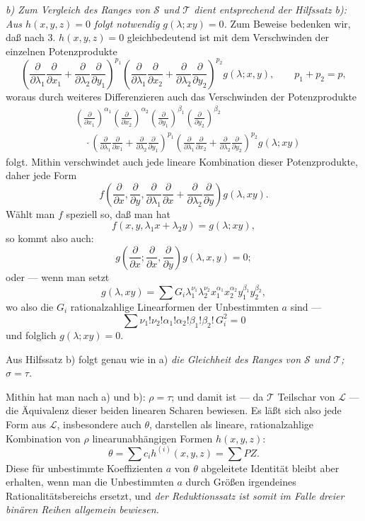 \documentclass[11pt]{article}
\begin{document}
\emph{b) Zum Vergleich des Ranges von $\mathcal S$ und $\mathcal T$ dient entsprechend der Hilfssatz b): Aus $h(x,y,z)=0$ folgt notwendig $g(\lambda;xy)=0$.} Zum Beweise bedenken wir, daß nach 3. $h(x,y,z)=0$ gleichbedeutend ist mit dem Verschwinden der einzelnen Potenzprodukte
\[
 \left(\frac{\partial}{\partial\lambda_1}\frac{\partial}{\partial x_1}
 +\frac{\partial}{\partial\lambda_2}\frac{\partial}{\partial y_1}\right)^{p_1}
 \left(\frac{\partial}{\partial\lambda_1}\frac{\partial}{\partial x_2}
 +\frac{\partial}{\partial\lambda_2}\frac{\partial}{\partial y_2}\right)^{p_2}g(\lambda;x,y),
 \qquad p_1+p_2=p,
\]
woraus durch weiteres Differenzieren auch das Verschwinden der Potenzprodukte
\[
\begin{aligned}
&\left(\frac{\partial}{\partial x_1}\right)^{\alpha_1}
 \left(\frac{\partial}{\partial x_2}\right)^{\alpha_2}
 \left(\frac{\partial}{\partial y_1}\right)^{\beta_1}
 \left(\frac{\partial}{\partial y_2}\right)^{\beta_2} \\
&\quad\cdot
 \left(\frac{\partial}{\partial\lambda_1}\frac{\partial}{\partial x_1}
 +\frac{\partial}{\partial\lambda_2}\frac{\partial}{\partial y_1}\right)^{p_1}
 \left(\frac{\partial}{\partial\lambda_1}\frac{\partial}{\partial x_2}
 +\frac{\partial}{\partial\lambda_2}\frac{\partial}{\partial y_2}\right)^{p_2}
 g(\lambda;xy)
\end{aligned}
\]
folgt. Mithin verschwindet auch jede lineare Kombination dieser Potenzprodukte, daher jede Form
\[
  f\left(\frac{\partial}{\partial x},\frac{\partial}{\partial y},
  \frac{\partial}{\partial\lambda_1}\frac{\partial}{\partial x}
  +\frac{\partial}{\partial\lambda_2}\frac{\partial}{\partial y}\right)g(\lambda,xy).
\]
Wählt man $f$ speziell so, daß man hat
\[
  f(x,y,\lambda_1x+\lambda_2y)=g(\lambda;xy),
\]
so kommt also auch:
\[
  g\left(\frac{\partial}{\partial x};
    \frac{\partial}{\partial x},
    \frac{\partial}{\partial y}\right)g(\lambda,x,y)=0;
\]
oder --- wenn man setzt
\[
  g(\lambda,xy)=\sum G_i\lambda_1^{\nu_1}\lambda_2^{\nu_2}
  x_1^{\alpha_1}x_2^{\alpha_2}y_1^{\beta_1}y_2^{\beta_2},
\]
wo also die $G_i$ rationalzahlige Linearformen der Unbestimmten $a$ sind ---
\[
  \sum \nu_1!\nu_2!\alpha_1!\alpha_2!\beta_1!\beta_2!\,G_i^2=0
\]
und folglich $g(\lambda;xy)=0$.

Aus Hilfssatz b) folgt genau wie in a) \emph{die Gleichheit des Ranges von $\mathcal S$ und $\mathcal T$; $\sigma=\tau$.}

Mithin hat man nach a) und b): $\rho=\tau$; und damit ist --- da $\mathcal T$ Teilschar von $\mathcal L$ --- die Äquivalenz dieser beiden linearen Scharen bewiesen. Es läßt sich also jede Form aus $\mathcal L$, insbesondere auch $\theta$, darstellen als lineare, rationalzahlige Kombination von $\rho$ linearunabhängigen Formen $h(x,y,z)$:
\[
  \theta=\sum c_i h^{(i)}(x,y,z)=\sum PZ.
\]
Diese für unbestimmte Koeffizienten $a$ von $\theta$ abgeleitete Identität bleibt aber erhalten, wenn man die Unbestimmten $a$ durch Größen irgendeines Rationalitätsbereichs ersetzt, und \emph{der Reduktionssatz ist somit im Falle dreier binären Reihen allgemein bewiesen.}
\end{document}
